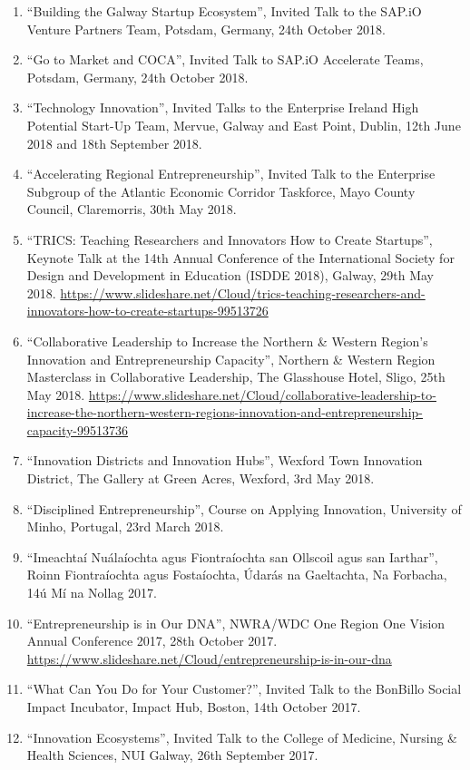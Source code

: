 \documentclass[10pt,a4paper]{res} %
\begin{document}
\begin{resume}
\begin{enumerate}
\item ``Building the Galway Startup Ecosystem'', Invited Talk to the SAP.iO Venture Partners Team, Potsdam, Germany, 24th October 2018.
\item ``Go to Market and COCA'', Invited Talk to SAP.iO Accelerate Teams, Potsdam, Germany, 24th October 2018.
\item ``Technology Innovation'', Invited Talks to the Enterprise Ireland High Potential Start-Up Team, Mervue, Galway and East Point, Dublin, 12th June 2018 and 18th September 2018.
\item ``Accelerating Regional Entrepreneurship'', Invited Talk to the Enterprise Subgroup of the Atlantic Economic Corridor Taskforce, Mayo County Council, Claremorris, 30th May 2018.
\item ``TRICS: Teaching Researchers and Innovators How to Create Startups'', Keynote Talk at the 14th Annual Conference of the International Society for Design and Development in Education (ISDDE 2018), Galway, 29th May 2018. \url{https://www.slideshare.net/Cloud/trics-teaching-researchers-and-innovators-how-to-create-startups-99513726}
\item ``Collaborative Leadership to Increase the Northern \& Western Region's Innovation and Entrepreneurship Capacity'', Northern \& Western Region Masterclass in Collaborative Leadership, The Glasshouse Hotel, Sligo, 25th May 2018. \url{https://www.slideshare.net/Cloud/collaborative-leadership-to-increase-the-northern-western-regions-innovation-and-entrepreneurship-capacity-99513736}
\item ``Innovation Districts and Innovation Hubs'', Wexford Town Innovation District, The Gallery at Green Acres, Wexford, 3rd May 2018.
\item ``Disciplined Entrepreneurship'', Course on Applying Innovation, University of Minho, Portugal, 23rd March 2018.
\item ``Imeachta\'{i} Nu\'{a}la\'{i}ochta agus Fiontra\'{i}ochta san Ollscoil agus san Iarthar'', Roinn Fiontra\'{i}ochta agus Fosta\'{i}ochta, \'{U}dar\'{a}s na Gaeltachta, Na Forbacha, 14\'{u} M\'{i} na Nollag 2017.
\item ``Entrepreneurship is in Our DNA'', NWRA/WDC One Region One Vision Annual Conference 2017, 28th October 2017. \url{https://www.slideshare.net/Cloud/entrepreneurship-is-in-our-dna}
\item ``What Can You Do for Your Customer?'', Invited Talk to the BonBillo Social Impact Incubator, Impact Hub, Boston, 14th October 2017.
\item ``Innovation Ecosystems'', Invited Talk to the College of Medicine, Nursing \& Health Sciences, NUI Galway, 26th September 2017.

\end{enumerate}
\end{resume}
\end{document}
